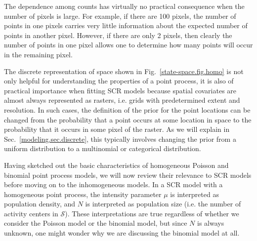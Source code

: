 The dependence among counts has virtually
no practical consequence when the number of pixels is large. For
example, if there are 100 pixels, the number of points in one pixels
carries very little information about the expected number of points in another
pixel. However, if there are only 2 pixels, then clearly the number of
points in one pixel allows one to determine how many points will occur in the
remaining pixel.

The discrete representation of space shown in
Fig.~\ref{state-space.fig.homo} is not only helpful for understanding
the properties of a point process, it is also of practical importance
when fitting SCR models because spatial covariates are almost always
represented as rasters, i.e. grids with predetermined extent and
resolution. In such cases, the definition of the prior for
the point locations can be changed from the probability that a point
occurs at some location in space to the probability that it occurs in
some pixel of the raster. As we will explain in
Sec.~\ref{modeling.sec.discrete}, this typically involves changing the
prior from a uniform distribution to a multinomial or categorical
distribution.

Having sketched out the basic characteristics
of homogeneous Poisson and binomial point process models, %
we will now review
their relevance to SCR models before moving on
to the inhomogeneous models. %
In a SCR model with a homogeneous point process, the intensity
parameter $\mu$ is interpreted as population density, and $N$ is
interpreted as population size (i.e. the
  number of activity centers in $\mathcal{S}$). These interpretations
are true regardless of whether we consider the
Poisson model or the binomial model, but since $N$ is always unknown, one
might wonder why we are discussing the binomial model at all. %

